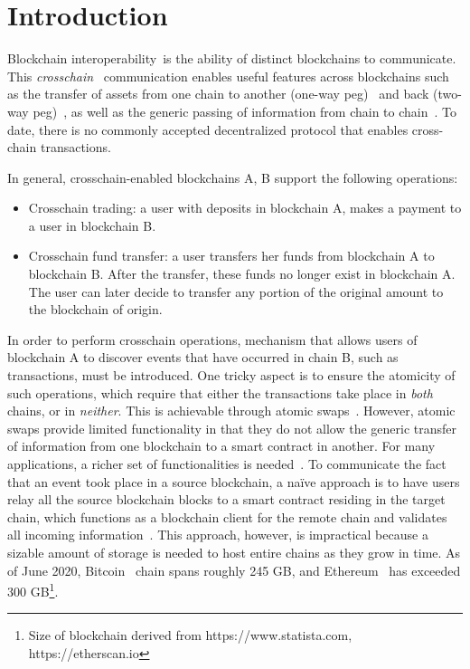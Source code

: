 \section{Introduction}

Blockchain interoperability\ifanonymous\else~\cite{dionyziz}\fi is the ability of distinct
blockchains to communicate.  This \emph{crosschain}~\cite{crosschain-sok,gtklocker} communication enables useful
features across blockchains such as the transfer of assets from one chain to
another (one-way peg)~\cite{burn} and back (two-way peg)~\cite{pos-sidechains},
as well as the generic passing of information from chain to chain~\cite{pow-sidechains}. To date,
there is no commonly accepted decentralized protocol that enables cross-chain
transactions.

\noindent

In general, crosschain-enabled blockchains A, B support the following
operations:

\begin{itemize}
\item Crosschain trading: a user with deposits in blockchain A, makes a
    payment to a user in blockchain B.
\item Crosschain fund transfer: a user transfers her funds from blockchain
    A to blockchain B. After the transfer, these funds no longer exist in
    blockchain A. The user can later decide to transfer any portion of the
    original amount to the blockchain of origin.
\end{itemize}

In order to perform crosschain operations, mechanism that
allows users of blockchain A to discover events that have occurred in chain B,
such as transactions, must be introduced. One tricky aspect is to ensure the atomicity of such
operations, which require that either the transactions take place in \emph{both}
chains, or in \emph{neither}.
This is achievable through atomic swaps~\cite{tiernolan,herlihy2018atomic}.
However, atomic swaps provide limited functionality in that they do not allow
the generic transfer of information from one blockchain to a smart contract in
another. For many applications, a richer set of
functionalities is needed~\cite{pow-sidechains,derivatives}.
To communicate the fact that an event took place in a source blockchain,
a na\"ive approach is to have users relay all the source blockchain blocks to a
smart contract residing in the target chain, which functions as a blockchain
client for the remote chain and validates all incoming information~\cite{btcrelay}.
This approach, however, is
impractical because a sizable amount of storage is needed to host entire
chains as they grow in time. As of June 2020, Bitcoin~\cite{nakamoto} chain
spans roughly 245 GB, and Ethereum~\cite{wood, buterin} has exceeded 300
GB\footnote{Size of blockchain derived from https://www.statista.com,
https://etherscan.io}.

